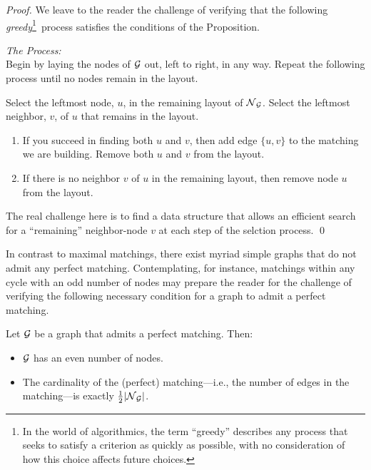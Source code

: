 \begin{proof}
We leave to the reader the challenge of verifying that the following
 {\em greedy}\footnote{In the world of
  algorithmics, the term ``greedy'' describes any process that seeks to
  satisfy a criterion as quickly as possible, with no consideration of
  how this choice affects future choices.}~process satisfies the
conditions of the Proposition.

\noindent
{\it The Process:} \\
Begin by laying the nodes of $\mbox{$\cal G$}$ out, left to right, in any way.
Repeat the following process until no nodes remain in the layout.

\noindent
Select the leftmost node, $u$, in the remaining layout of $\mbox{$\cal N$}_{\mbox{{\scriptsize $\cal G$}}}$.
Select the leftmost neighbor, $v$, of $u$ that remains in the layout.
  \begin{enumerate}
  \item
If you succeed in finding both $u$ and $v$, then add edge $\{u,v\}$ to
the matching we are building.  Remove both $u$ and $v$ from the
layout.
  \item
If there is no neighbor $v$ of $u$ in the remaining layout, then
remove node $u$ from the layout.
  \end{enumerate}
The real challenge here is to find a data structure that allows an
efficient search for a ``remaining'' neighbor-node $v$ at each step of
the selction process.
\qed
\end{proof}

\medskip

In contrast to maximal matchings, there exist myriad simple graphs
that do not admit any perfect matching.  Contemplating, for instance,
matchings within any cycle with an odd number of nodes may prepare the
reader for the challenge of verifying the following necessary
condition for a graph to admit a perfect matching.

\begin{prop}
\label{thm:necessary-for-perfect-matching}
Let $\mbox{$\cal G$}$ be a graph that admits a perfect matching.  Then:
\begin{itemize}
\item
$\mbox{$\cal G$}$ has an even number of nodes.
\item
The cardinality of the (perfect) matching---i.e., the number of edges
in the matching---is exactly
$\frac{1}{2}|\mbox{$\cal N$}_{\mbox{{\scriptsize $\cal G$}}}|$.
\end{itemize}
\end{prop}


\bigskip

